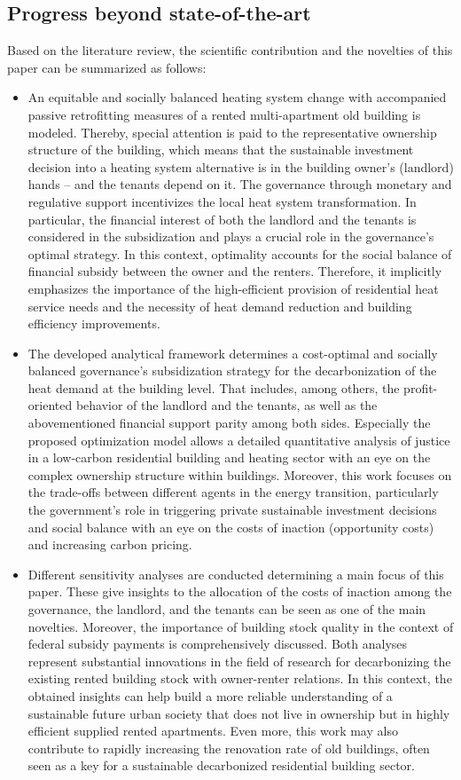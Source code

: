 \subsection{Progress beyond state-of-the-art}\label{novelties}
Based on the literature review, the scientific contribution and the novelties of this paper can be summarized as follows:
\begin{itemize}
	\item An equitable and socially balanced heating system change with accompanied passive retrofitting measures of a rented multi-apartment old building is modeled. Thereby, special attention is paid to the representative ownership structure of the building, which means that the sustainable investment decision into a heating system alternative is in the building owner's (landlord) hands – and the tenants depend on it. The governance through monetary and regulative support incentivizes the local heat system transformation. In particular, the financial interest of both the landlord and the tenants is considered in the subsidization and plays a crucial role in the governance’s optimal strategy. In this context, optimality accounts for the social balance of financial subsidy between the owner and the renters. Therefore, it implicitly emphasizes the importance of the high-efficient provision of residential heat service needs and the necessity of heat demand reduction and building efficiency improvements.
	\item The developed analytical framework determines a cost-optimal and socially balanced governance’s subsidization strategy for the decarbonization of the heat demand at the building level. That includes, among others, the profit-oriented behavior of the landlord and the tenants, as well as the abovementioned financial support parity among both sides.  Especially the proposed optimization model allows a detailed quantitative analysis of justice in a low-carbon residential building and heating sector with an eye on the complex ownership structure within buildings. Moreover, this work focuses on the trade-offs between different agents in the energy transition, particularly the government’s role in triggering private sustainable investment decisions and social balance with an eye on the costs of inaction (opportunity costs) and increasing carbon pricing.	
	\item Different sensitivity analyses are conducted determining a main focus of this paper. These give insights to the allocation of the costs of inaction among the governance, the landlord, and the tenants can be seen as one of the main novelties. Moreover, the importance of building stock quality in the context of federal subsidy payments is comprehensively discussed. Both analyses represent substantial innovations in the field of research for decarbonizing the existing rented building stock with owner-renter relations. In this context, the obtained insights can help build a more reliable understanding of a sustainable future urban society that does not live in ownership but in highly efficient supplied rented apartments. Even more, this work may also contribute to rapidly increasing the renovation rate of old buildings, often seen as a key for a sustainable decarbonized residential building sector.
\end{itemize}